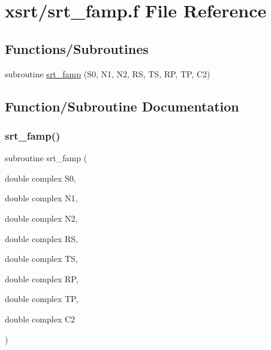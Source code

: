 \hypertarget{xsrt_2srt__famp_8f}{}\section{xsrt/srt\+\_\+famp.f File Reference}
\label{xsrt_2srt__famp_8f}
\subsection*{Functions/\+Subroutines}
\begin{DoxyCompactItemize}
\item 
subroutine \hyperlink{xsrt_2srt__famp_8f_a452255f6aeaf3544663ea78f20d4e260}{srt\+\_\+famp} (S0, N1, N2, RS, TS, RP, TP, C2)
\end{DoxyCompactItemize}


\subsection{Function/\+Subroutine Documentation}
\mbox{\label{xsrt_2srt__famp_8f_a452255f6aeaf3544663ea78f20d4e260}} 
\subsubsection{\texorpdfstring{srt\+\_\+famp()}{srt\_famp()}}
{\footnotesize\ttfamily subroutine srt\+\_\+famp (\begin{DoxyParamCaption}\item[{double complex}]{S0,  }\item[{double complex}]{N1,  }\item[{double complex}]{N2,  }\item[{double complex}]{RS,  }\item[{double complex}]{TS,  }\item[{double complex}]{RP,  }\item[{double complex}]{TP,  }\item[{double complex}]{C2 }\end{DoxyParamCaption})}

